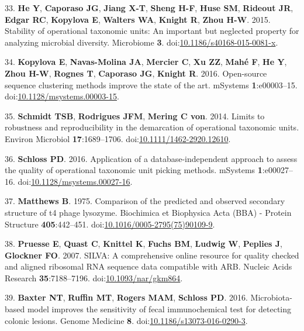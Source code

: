 \documentclass[11pt,]{article}
\begin{document}
\hypertarget{ref-He2015}{}
33. \textbf{He Y}, \textbf{Caporaso JG}, \textbf{Jiang X-T},
\textbf{Sheng H-F}, \textbf{Huse SM}, \textbf{Rideout JR}, \textbf{Edgar
RC}, \textbf{Kopylova E}, \textbf{Walters WA}, \textbf{Knight R},
\textbf{Zhou H-W}. 2015. Stability of operational taxonomic units: An
important but neglected property for analyzing microbial diversity.
Microbiome \textbf{3}.
doi:\href{https://doi.org/10.1186/s40168-015-0081-x}{10.1186/s40168-015-0081-x}.

\hypertarget{ref-Kopylova2016}{}
34. \textbf{Kopylova E}, \textbf{Navas-Molina JA}, \textbf{Mercier C},
\textbf{Xu ZZ}, \textbf{Mahé F}, \textbf{He Y}, \textbf{Zhou H-W},
\textbf{Rognes T}, \textbf{Caporaso JG}, \textbf{Knight R}. 2016.
Open-source sequence clustering methods improve the state of the art.
mSystems \textbf{1}:e00003--15.
doi:\href{https://doi.org/10.1128/msystems.00003-15}{10.1128/msystems.00003-15}.

\hypertarget{ref-Schmidt2014}{}
35. \textbf{Schmidt TSB}, \textbf{Rodrigues JFM}, \textbf{Mering C von}.
2014. Limits to robustness and reproducibility in the demarcation of
operational taxonomic units. Environ Microbiol \textbf{17}:1689--1706.
doi:\href{https://doi.org/10.1111/1462-2920.12610}{10.1111/1462-2920.12610}.

\hypertarget{ref-Schloss2016a}{}
36. \textbf{Schloss PD}. 2016. Application of a database-independent
approach to assess the quality of operational taxonomic unit picking
methods. mSystems \textbf{1}:e00027--16.
doi:\href{https://doi.org/10.1128/msystems.00027-16}{10.1128/msystems.00027-16}.

\hypertarget{ref-Matthews1975}{}
37. \textbf{Matthews B}. 1975. Comparison of the predicted and observed
secondary structure of t4 phage lysozyme. Biochimica et Biophysica Acta
(BBA) - Protein Structure \textbf{405}:442--451.
doi:\href{https://doi.org/10.1016/0005-2795(75)90109-9}{10.1016/0005-2795(75)90109-9}.

\hypertarget{ref-Pruesse2007}{}
38. \textbf{Pruesse E}, \textbf{Quast C}, \textbf{Knittel K},
\textbf{Fuchs BM}, \textbf{Ludwig W}, \textbf{Peplies J},
\textbf{Glockner FO}. 2007. SILVA: A comprehensive online resource for
quality checked and aligned ribosomal RNA sequence data compatible with
ARB. Nucleic Acids Research \textbf{35}:7188--7196.
doi:\href{https://doi.org/10.1093/nar/gkm864}{10.1093/nar/gkm864}.

\hypertarget{ref-Baxter2016}{}
39. \textbf{Baxter NT}, \textbf{Ruffin MT}, \textbf{Rogers MAM},
\textbf{Schloss PD}. 2016. Microbiota-based model improves the
sensitivity of fecal immunochemical test for detecting colonic lesions.
Genome Medicine \textbf{8}.
doi:\href{https://doi.org/10.1186/s13073-016-0290-3}{10.1186/s13073-016-0290-3}.
\end{document}
